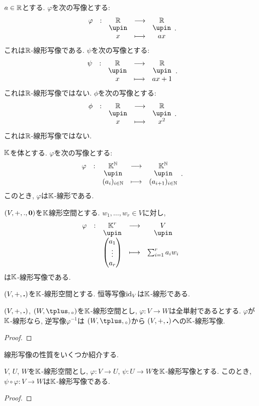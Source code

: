 \begin{example}
  $a\in\mathbb{R}$とする.
  $\varphi$を次の写像とする:
  \begin{align*}
    \shazo{\varphi}{\RR}{\RR}{x}{ax}.
  \end{align*}
  これは$\mathbb{R}$-線形写像である.
  $\psi$を次の写像とする:
  \begin{align*}
    \shazo{\psi}{\RR}{\RR}{x}{ax+1}.
  \end{align*}
  これは$\mathbb{R}$-線形写像ではない.
  $\phi$を次の写像とする:
  \begin{align*}
    \shazo{\phi}{\RR}{\RR}{x}{x^2}.
  \end{align*}
  これは$\mathbb{R}$-線形写像ではない.
\end{example}

\begin{example}
  $\mathbb{K}$を体とする.
  $\varphi$を次の写像とする:
  \begin{align*}
    \shazo{\varphi}{\KK^\NN}{\KK^\NN}{(a_i)_{i\in \NN}}{(a_{i+1})_{i\in \NN}}.
  \end{align*}
  このとき, $\varphi$は$\mathbb{K}$-線形である.
\end{example}

\begin{example}
  $(V,+,.,\boldsymbol{0})$を$\mathbb{K}$線形空間とする.
  $w_1,\ldots,w_r\in V$に対し,
    \begin{align*}
      \shazo{\varphi}{\KK^r}{V}
      {\begin{pmatrix}a_1\\\vdots\\a_r\end{pmatrix}}{\sum_{i=1}^{r}a_iw_i}
    \end{align*}
  は$\mathbb{K}$-線形写像である.
\end{example}


\begin{example}
  $(V,+,\mathbin{\boldsymbol{.}})$を$\mathbb{K}$-線形空間とする.
  恒等写像$\operatorname{id}_V$は$\mathbb{K}$-線形である.
\end{example}
\begin{lemma}
  $(V,+,\mathbin{\boldsymbol{.}})$, $(W,\pplus,\aact)$を$\mathbb{K}$-線形空間とし,
  $\varphi\colon V\to W$は全単射であるとする.
  $\varphi$が$\mathbb{K}$-線形なら,
  逆写像$\varphi^{-1}$は
  $(W,\pplus,\aact)$から
  $(V,+,\mathbin{\boldsymbol{.}})$への$\mathbb{K}$-線形写像.
\end{lemma}
\begin{proof}\end{proof}

線形写像の性質をいくつか紹介する.
\begin{prop}
  $V$, $U$, $W$を$\mathbb{K}$-線形空間とし,
  $\varphi\colon V\to U$,
  $\psi\colon U\to W$を$\mathbb{K}$-線形写像とする.
  このとき, $\psi\circ\varphi\colon V\to W$は$\mathbb{K}$-線形写像である.
\end{prop}
\begin{proof}\end{proof}

